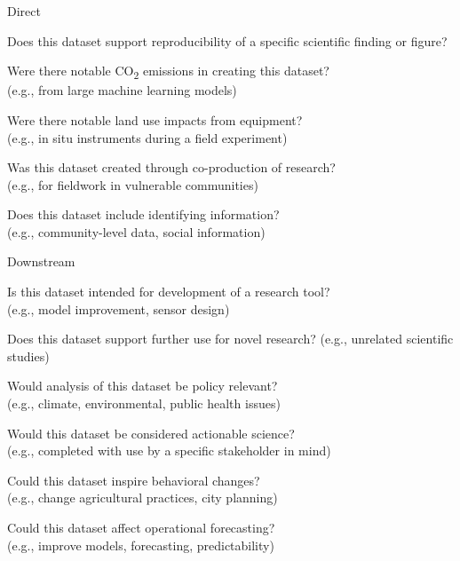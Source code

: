 \documentclass[letterpaper, 10 pt, transmag]{IEEEtran}
\newcommand{\checked}{✓}
\begin{document}

Direct
\begin{todolist}
  \item Does this dataset support reproducibility of a specific scientific finding or figure?
  \item Were there notable CO\textsubscript{2} emissions in creating this dataset? \\ 
  (e.g., from large machine learning models)
  \item Were there notable land use impacts from equipment? \\
  (e.g., in situ instruments during a field experiment)
  \item Was this dataset created through co-production of research? \\
  (e.g., for fieldwork in vulnerable communities)
  \item Does this dataset include identifying information? \\
  (e.g., community-level data, social information) 
  

\end{todolist}

Downstream
\begin{todolist}
  \item Is this dataset intended for development of a research tool? \\
  (e.g., model improvement, sensor design)
  \item Does this dataset support further use for novel research? (e.g., unrelated scientific studies)
  \item Would analysis of this dataset be policy relevant? \\
  (e.g., climate, environmental, public health issues)
  \item Would this dataset be considered actionable science? \\ 
  (e.g., completed with use by a specific stakeholder in mind)
  \item Could this dataset inspire behavioral changes? \\
  (e.g., change agricultural practices, city planning)
  \item Could this dataset affect operational forecasting? \\
  (e.g., improve models, forecasting, predictability)
\end{todolist}
\end{document}
